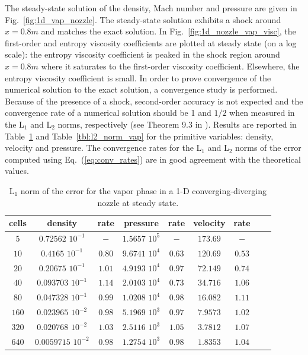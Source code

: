 \documentclass[review,10pt]{elsarticle}
\newcommand{\eqt}[1]{Eq.~(\ref{#1})}                     %
\newcommand{\fig}[1]{Fig.~\ref{#1}}                      %
\newcommand{\tbl}[1]{Table~\ref{#1}}                     %
\begin{document}
%
The steady-state solution of the density, Mach number and pressure are given in \fig{fig:1d_vap_nozzle}. 
The steady-state solution exhibits a shock around $x=0.8m$ and matches the exact solution. In \fig{fig:1d_nozzle_vap_visc}, 
the first-order and entropy viscosity coefficients are plotted at steady state (on a log scale): the entropy viscosity 
coefficient is peaked in the shock region around $x=0.8m$ where it saturates to the first-order viscosity 
coefficient. 
Elsewhere, the entropy  viscosity coefficient is small. 
In order to prove convergence of the numerical solution to the exact solution, a convergence study is performed. Because 
of the presence of a shock, second-order accuracy is not expected and the convergence rate of a numerical solution 
should be 1 and $1/2$ when measured in the L$_1$ and L$_2$ norms, respectively (see Theorem 9.3 in \cite{convergence_book}). 
Results are reported in \tbl{tbl:l1_norm_vap} and \tbl{tbl:l2_norm_vap} for the primitive variables: density, 
velocity and pressure. The convergence rates for the L$_1$ and L$_2$ norms of the error computed using \eqt{eq:conv_rates} 
are in good agreement with the theoretical values.
%
\begin{table}[!htbp]
\begin{center}
 \caption{\label{tbl:l1_norm_vap} L$_1$ norm of the error for the vapor phase in a 1-D converging-diverging nozzle at steady state.}
 \begin{tabular}{|c|c|c|c|c|c|c|c|c|}
 \hline
cells & density              & rate      & pressure          & rate      & velocity & rate      \\ \hline
$5$  & $0.72562$   $10^{-1}$ & $-$       & $1.5657$ $10^{5}$ & $-$       & $173.69$ & $-$       \\ \hline
$10$ & $0.4165$    $10^{-1}$ & $0.80$ & $9.6741$ $10^{4}$ & $0.63$ & $120.69$ & $0.53$ \\ \hline
$20$ & $0.20675$   $10^{-1}$ & $1.01$  & $4.9193$ $10^{4}$ & $0.97$ & $72.149$ & $0.74$ \\ \hline
$40$ & $0.093703$  $10^{-1}$ & $1.14$  & $2.0103$ $10^{4}$ & $0.73$ & $34.716$ & $1.06$  \\ \hline
$80$ & $0.047328$  $10^{-1}$ & $0.99$  & $1.0208$ $10^{4}$ & $0.98$  & $16.082$ & $1.11$  \\ \hline
$160$& $0.023965$  $10^{-2}$ & $0.98$  & $5.1969$ $10^{3}$ & $0.97$  & $7.9573$ & $1.02$  \\ \hline
$320$& $0.020768$  $10^{-2}$ & $1.03$  & $2.5116$ $10^{3}$ & $1.05$  & $3.7812$ & $1.07$  \\ \hline
$640$& $0.0059715$ $10^{-2}$ & $0.98$  & $1.2754$ $10^{3}$ & $0.98$  & $1.8353$ & $1.04$  \\ \hline
\end{tabular}
\end{center}
\nonumber
\end{table}
\end{document}
